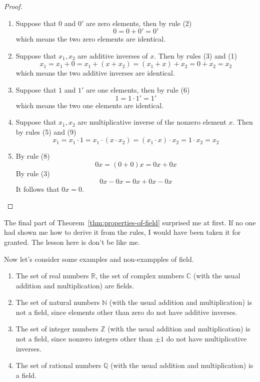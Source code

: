 \begin{proof}
    \begin{enumerate}[label = (\roman*)]
        \item Suppose that $0$ and $0'$ are zero elements, then by rule (2)
            \[
                0 = 0 + 0' = 0'
            \]
            which means the two zero elements are identical.
        \item Suppose that $x_{1}, x_{2}$ are additive inverses of $x$. Then by rules (3) and (1)
            \[
                x_{1} = x_{1} + 0 = x_{1} + (x + x_{2}) = (x_{1} + x) + x_{2} = 0 + x_{2} = x_{2}
            \]
            which means the two additive inverses are identical.
        \item Suppose that $1$ and $1'$ are one elements, then by rule (6)
            \[
                1 = 1\cdot 1' = 1'
            \]
            which means the two one elements are identical.
        \item Suppose that $x_{1}, x_{2}$ are multiplicative inverse of the nonzero element $x$. Then by rules (5) and (9)
            \[
                x_{1} = x_{1}\cdot 1 = x_{1}\cdot (x\cdot x_{2}) = (x_{1}\cdot x)\cdot x_{2} = 1\cdot x_{2} = x_{2}
            \]
        \item By rule (8)
            \[
                0x = (0 + 0)x = 0x + 0x
            \]
            By rule (3)
            \[
                0x - 0x = 0x + 0x - 0x
            \]
            It follows that $0x = 0$.\qedhere
    \end{enumerate}
\end{proof}

\begin{note}
    The final part of Theorem~\ref{thm:properties-of-field} surprised me at first. If no one had shown me how to derive it from the rules, I would have been taken it for granted. The lesson here is don't be like me.
\end{note}

Now let's consider some examples and non-exampples of field.

\begin{example}
    \begin{enumerate}[label = (\alph*)]
        \item The set of real numbers $\mathbb{R}$, the set of complex numbers $\mathbb{C}$ (with the usual addition and multiplication) are fields.
        \item The set of natural numbers $\mathbb{N}$ (with the usual addition and multiplication) is not a field, since elements other than zero do not have additive inverses.
        \item The set of integer numbers $\mathbb{Z}$ (with the usual addition and multiplication) is not a field, since nonzero integers other than $\pm 1$ do not have multiplicative inverses.
        \item The set of rational numbers $\mathbb{Q}$ (with the usual addition and multiplication) is a field.
    \end{enumerate}
\end{example}

